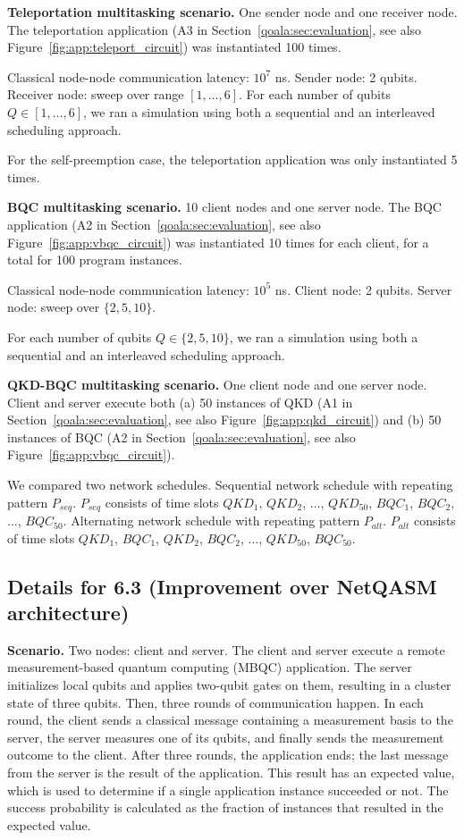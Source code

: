 \textbf{Teleportation multitasking scenario.}
One sender node and one receiver node.
The teleportation application (A3 in Section~\ref{qoala:sec:evaluation}, see also Figure~\ref{fig:app:teleport_circuit}) was instantiated 100 times.

Classical node-node communication latency: $10^7$ ns.
Sender node: 2 qubits.
Receiver node: sweep over range $[1, \dots, 6]$.
For each number of qubits $Q \in [1, \dots, 6]$, we ran a simulation using both a sequential and an interleaved scheduling approach.

For the self-preemption case, the teleportation application was only instantiated 5 times.

\textbf{BQC multitasking scenario.}
10 client nodes and one server node.
The BQC application (A2 in Section~\ref{qoala:sec:evaluation}, see also Figure~\ref{fig:app:vbqc_circuit}) was instantiated 10 times for each client, for a total for 100 program instances.

Classical node-node communication latency: $10^5$ ns.
Client node: 2 qubits.
Server node: sweep over $\{2, 5, 10\}$.

For each number of qubits $Q \in \{2, 5, 10\}$, we ran a simulation using both a sequential and an interleaved scheduling approach.

\textbf{QKD-BQC multitasking scenario.}
One client node and one server node.
Client and server execute both (a) 50 instances of QKD (A1 in Section~\ref{qoala:sec:evaluation}, see also Figure~\ref{fig:app:qkd_circuit}) and (b) 50 instances of BQC (A2 in Section~\ref{qoala:sec:evaluation}, see also Figure~\ref{fig:app:vbqc_circuit}).

We compared two network schedules.
Sequential network schedule with repeating pattern $P_{seq}$. $P_{seq}$ consists of time slots $QKD_1$, $QKD_2$, $\dots$, $QKD_{50}$, $BQC_1$, $BQC_2$, $\dots$, $BQC_{50}$.
Alternating network schedule with repeating pattern $P_{alt}$. $P_{alt}$ consists of time slots $QKD_1$, $BQC_1$, $QKD_2$, $BQC_2$, $\dots$, $QKD_{50}$, $BQC_{50}$.

\subsection{Details for 6.3 (Improvement over NetQASM architecture)}

\textbf{Scenario.}
Two nodes: client and server.
The client and server execute a remote measurement-based quantum computing (MBQC) application.
The server initializes local qubits and applies two-qubit gates on them, resulting in a cluster state of three qubits.
Then, three rounds of communication happen.
In each round, the client sends a classical message containing a measurement basis to the server, the server measures one of its qubits, and finally sends the measurement outcome to the client.
After three rounds, the application ends; the last message from the server is the result of the application.
This result has an expected value, which is used to determine if a single application instance succeeded or not.
The success probability is calculated as the fraction of instances that resulted in the expected value.

